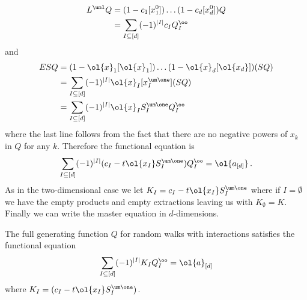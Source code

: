 \begin{align}\begin{split}
	L^{\um 1} Q &= (1-c_1[x_1^0])\ldots(1-c_d[x_d^0])Q \\
	&=  \sum_{I\subseteq [d]} (-1)^{|I|} c_I Q_I^\oo
\end{split}\end{align}
and
\begin{align}\begin{split}
	 ESQ &= (1-\ol{x}_1[\ol{x}_1])\ldots(1-\ol{x}_d[\ol{x_d}])(SQ) \\
	 &= \sum_{I\subseteq [d]} (-1)^{|I|} \ol{x}_I [x_I^{\um \one}](SQ) \\
	 &= \sum_{I\subseteq [d]} (-1)^{|I|} \ol{x}_I S_I^{\um \one}Q_I^\oo
\end{split}\end{align}
where the last line follows from the fact that there are no negative powers of $x_k$ in $Q$ for any $k$.
Therefore the functional equation is
\begin{align}
    \sum_{I \subseteq [d]}(-1)^{|I|}(c_I-t \ol{x_I}S_{I}^{\um \one})Q_I^\oo = \ol{a_{[d]}}\,.
\end{align}
As in the two-dimensional case we let $K_I = c_I-t \ol{x_I}S_{I}^{\um \one}$ where if $I =\emptyset$ we have the empty products and empty extractions leaving us with $K_{\emptyset} = K$. Finally we can write the master equation in $d$-dimensions.
\begin{theorem} The full generating function $Q$ for random walks with interactions satisfies the functional equation
\begin{align}
   \sum_{I\subseteq [d]}(-1)^{|I|} K_I Q_I^\oo= \ol{a}_{[d]}
\end{align}
where $K_I = (c_I-t \ol{x_I}S_{I}^{\um \one})$.
\end{theorem}
